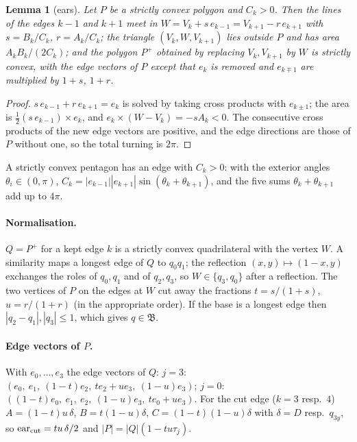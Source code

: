 \documentclass[11pt]{article}
\newtheorem{lemma}[theorem]{Lemma}
\theoremstyle{remark}
\begin{document}
\begin{lemma}[ears]\label{lem:ear}
Let $P$ be a strictly convex polygon and $C_k>0$. Then the lines of the edges $k-1$ and $k+1$ meet in
$W=V_k+s\,e_{k-1}=V_{k+1}-r\,e_{k+1}$ with $s=B_k/C_k$, $r=A_k/C_k$; the triangle $(V_k,W,V_{k+1})$ lies outside $P$ and has
area $A_kB_k/(2C_k)$; and the polygon $P^+$ obtained by replacing $V_k,V_{k+1}$ by $W$ is strictly convex, with the
edge vectors of $P$ except that $e_k$ is removed and $e_{k\mp1}$ are multiplied by $1+s$, $1+r$.
\end{lemma}
\begin{proof}
$s\,e_{k-1}+r\,e_{k+1}=e_k$ is solved by taking cross products with $e_{k\pm1}$; the area is $\frac12(s\,e_{k-1})\times e_k$,
and $e_k\times(W-V_k)=-sA_k<0$. The consecutive cross products of the new edge vectors are positive, and the edge
directions are those of $P$ without one, so the total turning is $2\pi$.
\end{proof}
A strictly convex pentagon has an edge with $C_k>0$: with the exterior angles $\theta_i\in(0,\pi)$,
$C_k=|e_{k-1}||e_{k+1}|\sin(\theta_k+\theta_{k+1})$, and the five sums $\theta_k+\theta_{k+1}$ add up to $4\pi$.

\paragraph{Normalisation.} $Q=P^+$ for a kept edge $k$ is a strictly convex quadrilateral with the vertex $W$. A
similarity maps a longest edge of $Q$ to $q_0q_1$; the reflection $(x,y)\mapsto(1-x,y)$ exchanges the roles of $q_0,q_1$
and of $q_2,q_3$, so $W\in\{q_3,q_0\}$ after a reflection. The two vertices of $P$ on the edges at $W$ cut away the
fractions $t=s/(1+s)$, $u=r/(1+r)$ (in the appropriate order). If the base is a longest edge then $|q_2-q_1|,|q_3|\le1$,
which gives $q\in\mathfrak B$.

\paragraph{Edge vectors of $P$.} With $e_0,\dots,e_3$ the edge vectors of $Q$:
$j=3$: $(e_0,\ e_1,\ (1-t)e_2,\ te_2+ue_3,\ (1-u)e_3)$; $j=0$: $((1-t)e_0,\ e_1,\ e_2,\ (1-u)e_3,\ te_0+ue_3)$. For the cut
edge ($k=3$ resp.\ $4$) $A=(1-t)u\,\delta$, $B=t(1-u)\delta$, $C=(1-t)(1-u)\delta$ with $\delta=D$ resp.\ $q_{3y}$, so
$\mathrm{ear}_{\rm cut}=tu\,\delta/2$ and $|P|=|Q|(1-tu\tau_j)$.
\end{document}
